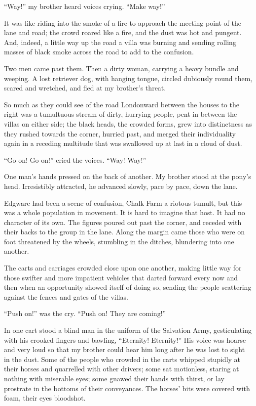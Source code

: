 ``Way!'' my brother heard voices crying. ``Make way!''

It was like riding into the smoke of a fire to approach the meeting
point of the lane and road; the crowd roared like a fire, and the
dust was hot and pungent. And, indeed, a little way up the road a
villa was burning and sending rolling masses of black smoke across
the road to add to the confusion.

Two men came past them. Then a dirty woman, carrying a heavy bundle
and weeping. A lost retriever dog, with hanging tongue, circled
dubiously round them, scared and wretched, and fled at my brother's
threat.

So much as they could see of the road Londonward between the houses
to the right was a tumultuous stream of dirty, hurrying people,
pent in between the villas on either side; the black heads, the
crowded forms, grew into distinctness as they rushed towards the
corner, hurried past, and merged their individuality again in a
receding multitude that was swallowed up at last in a cloud of
dust.

``Go on! Go on!'' cried the voices. ``Way! Way!''

One man's hands pressed on the back of another. My brother stood at
the pony's head. Irresistibly attracted, he advanced slowly, pace
by pace, down the lane.

Edgware had been a scene of confusion, Chalk Farm a riotous tumult,
but this was a whole population in movement. It is hard to imagine
that host. It had no character of its own. The figures poured out
past the corner, and receded with their backs to the group in the
lane. Along the margin came those who were on foot threatened by
the wheels, stumbling in the ditches, blundering into one another.

The carts and carriages crowded close upon one another, making
little way for those swifter and more impatient vehicles that
darted forward every now and then when an opportunity showed itself
of doing so, sending the people scattering against the fences and
gates of the villas.

``Push on!'' was the cry. ``Push on! They are coming!''

In one cart stood a blind man in the uniform of the Salvation Army,
gesticulating with his crooked fingers and bawling, ``Eternity!
Eternity!'' His voice was hoarse and very loud so that my brother
could hear him long after he was lost to sight in the dust. Some of
the people who crowded in the carts whipped stupidly at their
horses and quarrelled with other drivers; some sat motionless,
staring at nothing with miserable eyes; some gnawed their hands
with thirst, or lay prostrate in the bottoms of their conveyances.
The horses' bits were covered with foam, their eyes bloodshot.

